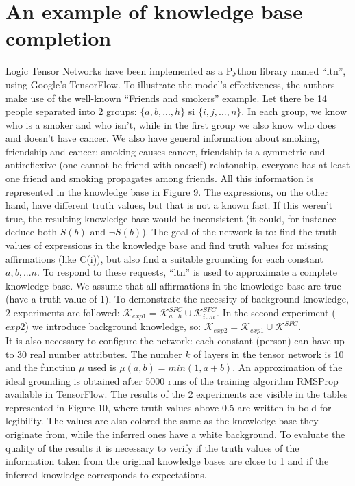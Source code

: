 \documentclass{article}
\begin{document}
\section{An example of knowledge base completion}
Logic Tensor Networks have been implemented as a Python library named ``ltn'', using Google's TensorFlow. To illustrate the model's effectiveness, the authors make use of the well-known ``Friends and smokers'' example. Let there be 14 people separated into 2 groups: $\{ a, b, ..., h\}$ si $\{ i, j, ..., n \}$. In each group, we know who is a smoker and who isn't, while in the first group we also know who does and doesn't have cancer. We also have general information about smoking, friendship and cancer: smoking causes cancer, friendship is a symmetric and antireflexive (one cannot be friend with oneself) relatonship, everyone has at least one friend and smoking propagates among friends. All this information is represented in the knowledge base in Figure 9. The expressions, on the other hand, have different truth values, but that is not a known fact. If this weren't true, the resulting knowledge base would be inconsistent (it could, for instance deduce both $S(b)$ and $\neg S(b)$). The goal of the network is to: find the truth values of expressions in the knowledge base and find truth values for missing affirmations (like C(i)), but also find a suitable grounding for each constant $a, b, ...n$. To respond to these requests, ``ltn'' is used to approximate a complete knowledge base. We assume that all affirmations in the knowledge base are true (have a truth value of 1). To demonstrate the necessity of background knowledge, 2 experiments are followed: $\mathcal{K}_{exp1} = \mathcal{K}_{a...h}^{SFC} \cup \mathcal{K}_{i...n}^{SFC}$. In the second experiment ($exp2$) we introduce background knowledge, so: $\mathcal{K}_{exp2} = \mathcal{K}_{exp1} \cup \mathcal{K}^{SFC}$.\\
It is also necessary to configure the network: each constant (person) can have up to 30 real number attributes. The number $k$ of layers in the tensor network is 10 and the functiun $\mu$ used is $\mu(a, b) = min(1, a + b)$. An approximation of the ideal grounding is obtained after 5000 runs of the training algorithm RMSProp available in TensorFlow. The results of the 2 experiments are visible in the tables represented in Figure 10, where truth values above 0.5 are written in bold for legibility. The values are also colored the same as the knowledge base they originate from, while the inferred ones have a white background. To evaluate the quality of the results it is necessary to verify if the truth values of the information taken from the original knowledge bases are close to 1 and if the inferred knowledge corresponds to expectations.\\
\end{document}
